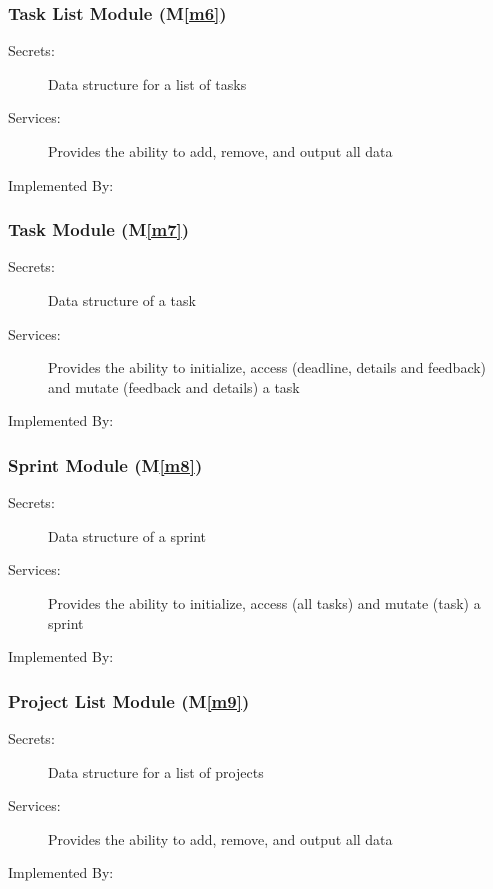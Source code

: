 \documentclass[12pt, titlepage]{article}
\newcommand{\mref}[1]{M\ref{#1}}
\begin{document}
\subsubsection{Task List Module (\mref{m6})}
\begin{description}
    \item[Secrets:] Data structure for a list of tasks
    \item[Services:] Provides the ability to add, remove, and output all data
    \item[Implemented By:] 
\end{description}

\subsubsection{Task Module (\mref{m7})}
\begin{description}
    \item[Secrets:] Data structure of a task
    \item[Services:] Provides the ability to initialize, access (deadline, details and feedback) and mutate (feedback and details) a task
    \item[Implemented By:] 
\end{description}

\subsubsection{Sprint Module (\mref{m8})}
\begin{description}
    \item[Secrets:] Data structure of a sprint
    \item[Services:] Provides the ability to initialize, access (all tasks) and mutate (task) a sprint
    \item[Implemented By:] 
\end{description}

\subsubsection{Project List Module (\mref{m9})}
\begin{description}
    \item[Secrets:] Data structure for a list of projects
    \item[Services:] Provides the ability to add, remove, and output all data
    \item[Implemented By:]
\end{description}
\end{document}
